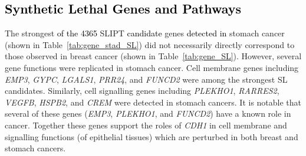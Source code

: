\subsection{\textcolor{black}{Synthetic Lethal Genes and Pathways}} \label{chapt3:stad_SL_genes}

The strongest \textcolor{black}{of the 4365} \gls{SLIPT} \textcolor{black}{candidate} genes \textcolor{black}{detected in} stomach cancer (shown in Table~\ref{tab:gene_stad_SL}) did not necessarily directly correspond to those observed in breast cancer (shown in Table~\ref{tab:gene_SL}). However, several gene functions were replicated in stomach cancer. Cell membrane genes including \textit{EMP3}, \textit{GYPC},  \textit{LGALS1}, \textit{PRR24},  and \textit{FUNCD2} were among the strongest SL candidates. Similarly, cell signalling genes including \textit{PLEKHO1}, \textit{RARRES2}, \textit{VEGFB}, \textit{HSPB2}, and \textit{CREM} were detected in stomach cancers. It is notable that several of these genes (\textit{EMP3}, \textit{PLEKHO1}, and \textit{FUNCD2}) have a known role in cancer. Together these genes support the roles of \textit{CDH1} in cell membrane and signalling functions (of epithelial tissues) which are perturbed in both breast and stomach cancers.


